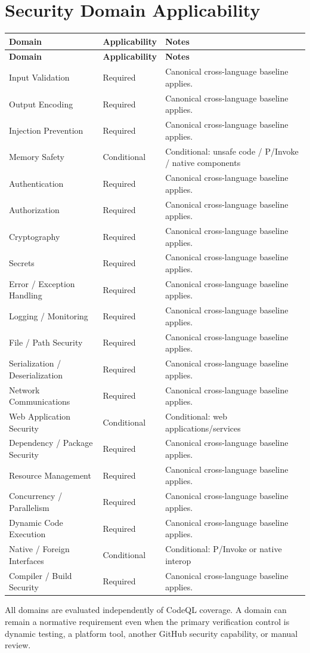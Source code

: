 \documentclass[10pt,letterpaper]{article}
\begin{document}
\section{Security Domain Applicability}
\small
\setlength{\tabcolsep}{3pt}
\begin{longtable}{@{}P{1.8in}P{0.85in}P{3.75in}@{}}
\toprule
\textbf{Domain} & \textbf{Applicability} & \textbf{Notes}\\
\midrule
\endfirsthead
\toprule
\textbf{Domain} & \textbf{Applicability} & \textbf{Notes}\\
\midrule
\endhead
Input Validation & Required & Canonical cross-language baseline applies.\\
Output Encoding & Required & Canonical cross-language baseline applies.\\
Injection Prevention & Required & Canonical cross-language baseline applies.\\
Memory Safety & Conditional & Conditional: unsafe code / P/Invoke / native components\\
Authentication & Required & Canonical cross-language baseline applies.\\
Authorization & Required & Canonical cross-language baseline applies.\\
Cryptography & Required & Canonical cross-language baseline applies.\\
Secrets & Required & Canonical cross-language baseline applies.\\
Error / Exception Handling & Required & Canonical cross-language baseline applies.\\
Logging / Monitoring & Required & Canonical cross-language baseline applies.\\
File / Path Security & Required & Canonical cross-language baseline applies.\\
Serialization / Deserialization & Required & Canonical cross-language baseline applies.\\
Network Communications & Required & Canonical cross-language baseline applies.\\
Web Application Security & Conditional & Conditional: web applications/services\\
Dependency / Package Security & Required & Canonical cross-language baseline applies.\\
Resource Management & Required & Canonical cross-language baseline applies.\\
Concurrency / Parallelism & Required & Canonical cross-language baseline applies.\\
Dynamic Code Execution & Required & Canonical cross-language baseline applies.\\
Native / Foreign Interfaces & Conditional & Conditional: P/Invoke or native interop\\
Compiler / Build Security & Required & Canonical cross-language baseline applies.\\
\bottomrule
\end{longtable}
\normalsize
All domains are evaluated independently of CodeQL coverage. A domain can remain a normative requirement even when the primary verification control is dynamic testing, a platform tool, another GitHub security capability, or manual review.
\end{document}
